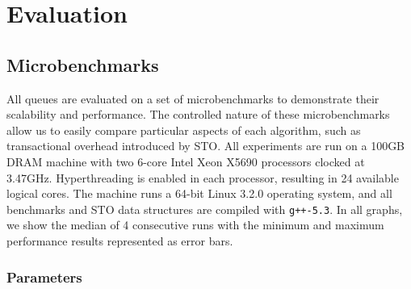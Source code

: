 \section{Evaluation}

\subsection{Microbenchmarks}
\label{q_microbenchmarks}

All queues are evaluated on a set of microbenchmarks to demonstrate their scalability and performance. The controlled nature of these microbenchmarks allow us to easily compare particular aspects of each algorithm, such as transactional overhead introduced by STO. All experiments are run on a 100GB DRAM machine with two 6-core Intel Xeon X5690 processors clocked at 3.47GHz. Hyperthreading is enabled in each processor, resulting in 24 available logical cores. The machine runs a 64-bit Linux 3.2.0 operating system, and all benchmarks and STO data structures are compiled with \texttt{g++-5.3}. In all graphs, we show the median of 4 consecutive runs with the minimum and maximum performance results represented as error bars.

\subsubsection{Parameters}

